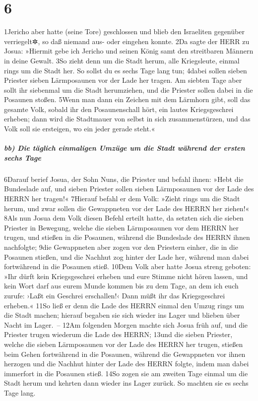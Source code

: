 \hypertarget{section-5}{%
\section{6}\label{section-5}}

1Jericho aber hatte (seine Tore) geschlossen und blieb den Israeliten
gegenüber verriegelt✲, so daß niemand aus- oder eingehen konnte. 2Da
sagte der HERR zu Josua: »Hiermit gebe ich Jericho und seinen König samt
den streitbaren Männern in deine Gewalt. 3So zieht denn um die Stadt
herum, alle Kriegsleute, einmal rings um die Stadt her. So sollst du es
sechs Tage lang tun; 4dabei sollen sieben Priester sieben Lärmposaunen
vor der Lade her tragen. Am siebten Tage aber sollt ihr siebenmal um die
Stadt herumziehen, und die Priester sollen dabei in die Posaunen stoßen.
5Wenn man dann ein Zeichen mit dem Lärmhorn gibt, soll das gesamte Volk,
sobald ihr den Posaunenschall hört, ein lautes Kriegsgeschrei erheben;
dann wird die Stadtmauer von selbst in sich zusammenstürzen, und das
Volk soll sie ersteigen, wo ein jeder gerade steht.«

\hypertarget{bb-die-tuxe4glich-einmaligen-umzuxfcge-um-die-stadt-wuxe4hrend-der-ersten-sechs-tage}{%
\subparagraph{bb) Die täglich einmaligen Umzüge um die Stadt während der
ersten sechs
Tage}\label{bb-die-tuxe4glich-einmaligen-umzuxfcge-um-die-stadt-wuxe4hrend-der-ersten-sechs-tage}}

6Darauf berief Josua, der Sohn Nuns, die Priester und befahl ihnen:
»Hebt die Bundeslade auf, und sieben Priester sollen sieben Lärmposaunen
vor der Lade des HERRN her tragen!« 7Hierauf befahl er dem Volk: »Zieht
rings um die Stadt herum, und zwar sollen die Gewappneten vor der Lade
des HERRN her ziehen!« 8Als nun Josua dem Volk diesen Befehl erteilt
hatte, da setzten sich die sieben Priester in Bewegung, welche die
sieben Lärmposaunen vor dem HERRN her trugen, und stießen in die
Posaunen, während die Bundeslade des HERRN ihnen nachfolgte; 9die
Gewappneten aber zogen vor den Priestern einher, die in die Posaunen
stießen, und die Nachhut zog hinter der Lade her, während man dabei
fortwährend in die Posaunen stieß. 10Dem Volk aber hatte Josua streng
geboten: »Ihr dürft kein Kriegsgeschrei erheben und eure Stimme nicht
hören lassen, und kein Wort darf aus eurem Munde kommen bis zu dem Tage,
an dem ich euch zurufe: ›Laßt ein Geschrei erschallen!‹ Dann müßt ihr
das Kriegsgeschrei erheben.« 11So ließ er denn die Lade des HERRN einmal
den Umzug rings um die Stadt machen; hierauf begaben sie sich wieder ins
Lager und blieben über Nacht im Lager.~-- 12Am folgenden Morgen machte
sich Josua früh auf, und die Priester trugen wiederum die Lade des
HERRN; 13und die sieben Priester, welche die sieben Lärmposaunen vor der
Lade des HERRN her trugen, stießen beim Gehen fortwährend in die
Posaunen, während die Gewappneten vor ihnen herzogen und die Nachhut
hinter der Lade des HERRN folgte, indem man dabei immerfort in die
Posaunen stieß. 14So zogen sie am zweiten Tage einmal um die Stadt herum
und kehrten dann wieder ins Lager zurück. So machten sie es sechs Tage
lang.

